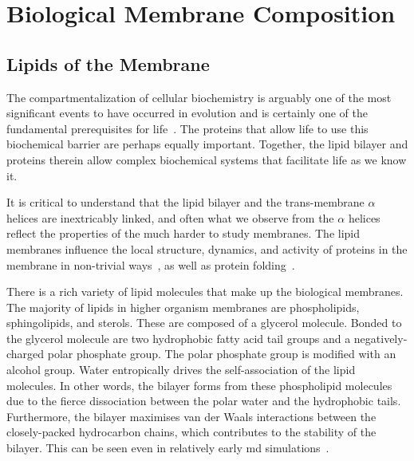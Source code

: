\section{Biological Membrane Composition}

\subsection{Lipids of the Membrane}

The compartmentalization of cellular biochemistry is arguably one of the most significant events to have occurred in evolution and is certainly one of the fundamental prerequisites for life~\cite{Koshland2002}.  The proteins that allow life to use this biochemical barrier are perhaps equally important. Together, the lipid bilayer and proteins therein allow complex biochemical systems that facilitate life as we know it.

It is critical to understand that the lipid bilayer and the trans-membrane $\alpha$ helices are inextricably linked, and often what we observe from the $\alpha$ helices reflect the properties of the much harder to study membranes. The lipid membranes influence the local structure, dynamics, and activity of proteins in the membrane in non-trivial ways~\cite{Bondar2010, Bondar2009, Jardon-Valadez2010, Kalvodova2005, Urban2005, White2001a, Jensen2004, Henin2014}, as well as protein folding~\cite{Kauko2010}. %

There is a rich variety of lipid molecules that make up the biological membranes. The majority of lipids in higher organism membranes are phospholipids, sphingolipids, and sterols. These are composed of a glycerol molecule. Bonded to the glycerol molecule are two hydrophobic fatty acid tail groups and a negatively-charged polar phosphate group. The polar phosphate group is modified with an alcohol group. Water entropically drives the self-association of the lipid molecules. In other words, the bilayer forms from these phospholipid molecules due to the fierce dissociation between the polar water and the hydrophobic tails. Furthermore, the bilayer maximises van der Waals interactions between the closely-packed hydrocarbon chains, which contributes to the stability of the bilayer. This can be seen even in relatively early \gls{md} simulations~\cite{Goetz1998}.


